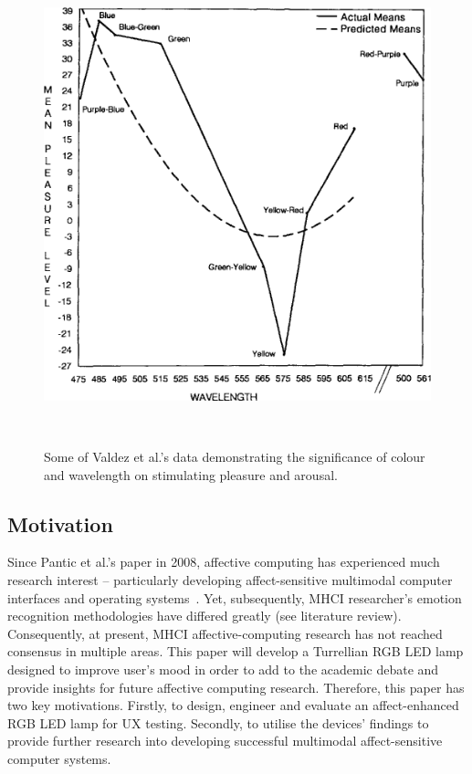 \documentclass{sigchi}
\begin{document}
\begin{figure}
\centering
  \includegraphics[width=0.9\columnwidth]{figures/Valdez}
  \caption{Some of Valdez et al.'s data demonstrating the significance of colour and wavelength on stimulating pleasure and arousal.}~\cite{valdez1994effects}~\label{fig:figure2}
\end{figure}


\subsection{Motivation}

Since Pantic et al.'s paper in 2008, affective computing has experienced much research interest – particularly developing affect-sensitive multimodal computer interfaces and operating systems~\cite{pantic2008human, 5771346}. Yet, subsequently, MHCI researcher’s emotion recognition methodologies have differed greatly (see literature review). Consequently, at present, MHCI affective-computing research has not reached consensus in multiple areas. This paper will develop a Turrellian RGB LED lamp designed to improve user’s mood in order to add to the academic debate and provide insights for future affective computing research. Therefore, this paper has two key motivations. Firstly, to design, engineer and evaluate an affect-enhanced RGB LED lamp for UX testing. Secondly, to utilise the devices’ findings to provide further research into developing successful multimodal affect-sensitive computer systems.
\end{document}
